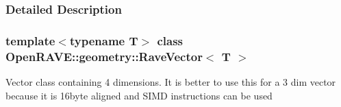 \subsubsection{Detailed Description}
\subsubsection*{template$<$typename T$>$ class OpenRAVE::geometry::RaveVector$<$ T $>$}

Vector class containing 4 dimensions. It is better to use this for a 3 dim vector because it is 16byte aligned and SIMD instructions can be used 